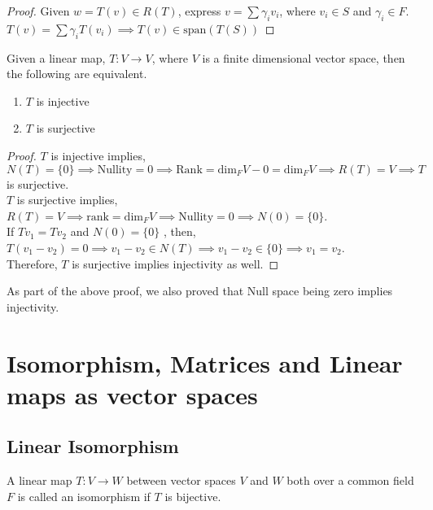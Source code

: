 \documentclass[11pt,a4paper]{colorart}
\def\l{\left}
\def\r{\right}
\def\g{\gamma}
\begin{document}
\begin{proof}
	Given $w=T\l(v\r)\in R\l(T\r)$, express $v=\sum \g_iv_i$, where $v_i\in S$ and $\g_i\in F$. $T\l(v\r)=\sum \g_iT\l(v_i\r) \implies T\l(v\r)\in\text{span}\l(T\l(S\r)\r)$
\end{proof}

\begin{corollary}
	Given a linear map, $T:V\rightarrow V$, where $V$ is a finite dimensional vector space, then the following are equivalent.
	\begin{enumerate}
		\item $T$ is injective
		\item $T$ is surjective
	\end{enumerate}
\end{corollary}

\begin{proof}
	$T$ is injective implies, $N\l(T\r)=\{0\}\implies \text{Nullity}=0\implies \text{Rank} = \text{dim}_FV-0=\text{dim}_FV\implies R\l(T\r)=V\implies T$ is surjective.\\
	$T$ is surjective implies, $R\l(T\r)=V\implies \text{rank}= \text{dim}_FV\implies \text{Nullity}=0\implies N\l(0\r) =\{0\}$.\\
	If $Tv_1=Tv_2$ and $N\l(0\r) =\{0\}$ , then, $T\l(v_1-v_2\r)=0\implies v_1-v_2\in N\l(T\r)\implies v_1-v_2 \in \{0\} \implies v_1=v_2$.\\
	Therefore, $T$ is surjective implies injectivity as well.
\end{proof}

\begin{remark}
	As part of the above proof, we also proved that Null space being zero implies injectivity.
\end{remark}


\section{Isomorphism, Matrices and Linear maps as vector spaces}

\subsection{Linear Isomorphism}

\begin{definition}
	A linear map $T:V\rightarrow W$ between vector spaces $V$ and $W$ both over a common field $F$ is called an isomorphism if $T$ is bijective.
\end{definition}
\end{document}
